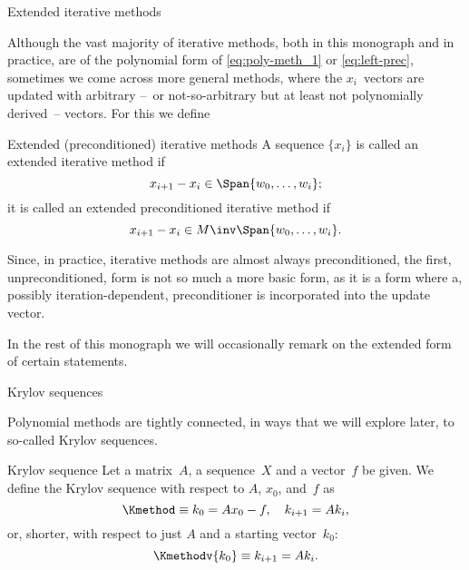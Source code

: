 \begin{comment}
\begin{lemma}
\label{BX-method}
If $\{x_i\}_{i\geq1}$ is a polynomial sequence 
for~$\bar x$ and $B$~is an invertible
matrix, then $\{Bx_i\}_{i\geq1}$~is a polynomial sequence for~$B\bar x$,
specifically, if $\{x_i\}_{i\geq1}$~is $\Pmethod$ then 
$\{Bx_i\}_{i\geq1}$~is
$\pxPmethod{BAB\inv}{Bx}{Bf}$.
\end{lemma}
\begin{proof} This follows from
        \[ Bx_{i+1}-Bx_0=\pi_i(BAB\inv)\{(BAB\inv)Bx_0-Bf\}. \]
\end{proof}
\end{comment}

\begin{extended}
 {Extended iterative methods}

Although the vast majority of iterative methods, both in this
monograph and in practice, are of the polynomial form of
\eqref{eq:poly-meth_1} or \eqref{eq:left-prec}, sometimes we come
across more general methods, where the $x_i$~vectors are updated with
arbitrary --~or not-so-arbitrary but at least not polynomially
derived~-- vectors. For this we define

\begin{ddefinition}{Extended (preconditioned) iterative methods}
A sequence $\{x_i\}$ is called an extended iterative method if
\[ x_{i+1}-x_i \in\Span{w_0,\ldots,w_i}; \]
it is called an extended preconditioned iterative method if
\[ x_{i+1}-x_i \in M\inv \Span{w_0,\ldots,w_i}. \]
\end{ddefinition}

Since, in practice, iterative methods are almost always preconditioned,
the first, unpreconditioned, form is not so much a more basic form, as
it is a form where a, possibly iteration-dependent, preconditioner is
incorporated into the update vector.

In the rest of this monograph we will occasionally remark on the
extended form of certain statements.
\end{extended}

 {Krylov sequences}

Polynomial methods are tightly connected, in ways that we will explore
later, to so-called Krylov sequences.

\begin{ddefinition}{Krylov sequence}
Let a matrix~$A$, a sequence~$X$ and a vector~$f$ be given.
We define the Krylov sequence with respect to $A$, $x_0$, and~$f$ as
\[ \Kmethod\equiv k_0=Ax_0-f,\quad k_{i+1}=Ak_i, \]
or, shorter, with respect to just $A$ and a starting vector~$k_0$:
\[ \Kmethodv{k_0}\equiv k_{i+1}=Ak_i. \]
\end{ddefinition}

